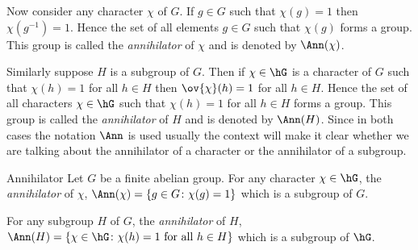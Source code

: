 Now consider any character $\chi$ of $G$. If $g\in G$ such that $\chi(g)=1$ then $\chi(g^{-1})=1$. Hence the set of all elements $g\in G$ such that $\chi(g)$ forms a group. This group is called the \emph{annihilator} of $\chi$ and is denoted by $\Ann(\chi)$.

Similarly suppose $H$ is a subgroup of $G$. Then if $\chi\in\hG$ is a character of $G$ such that $\chi(h)=1$ for all $h\in H$ then $\ov{\chi}(h)=1$ for all $h\in H$. Hence the set of all characters $\chi\in \hG$ such that $\chi(h)=1$ for all $h\in H$ forms a group. This group is called the \emph{annihilator} of $H$ and is denoted by $\Ann(H)$. Since in both cases the notation $\Ann$ is used usually the context will make it clear whether we are talking about the annihilator of a character or the annihilator of a subgroup.

\begin{Definition}{Annihilator}{}
  Let $G$ be a finite abelian group. For any character $\chi\in \hG$, the \emph{annihilator} of $\chi$, $\Ann(\chi)=\{g\in G\colon \chi(g)=1\}$ which is a subgroup of $G$. \setlength{\parindent}{15pt}

  For any subgroup $H$ of $G$, the \emph{annihilator} of $H$, $\Ann(H)=\{\chi\in \hG\colon \chi(h)=1 \text{ for all } h\in H\}$ which is a subgroup of $\hG$.
\end{Definition}


